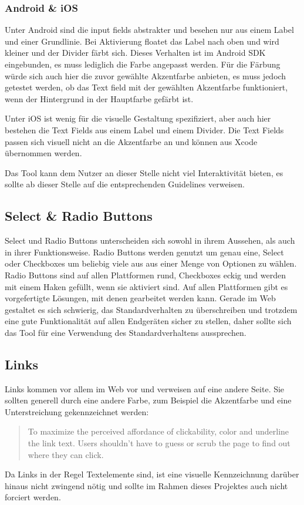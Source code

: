 \subsubsection{Android \& iOS}
Unter Android sind die input fields abstrakter und besehen nur aus einem Label und einer Grundlinie. Bei Aktivierung floatet das Label nach oben und wird kleiner und der Divider färbt sich. Dieses Verhalten ist im Android SDK eingebunden, es muss lediglich die Farbe angepasst werden.
Für die Färbung würde sich auch hier die zuvor gewählte Akzentfarbe anbieten, es muss jedoch getestet werden, ob das Text field mit der gewählten Akzentfarbe funktioniert, wenn der Hintergrund in der Hauptfarbe gefärbt ist.

Unter iOS ist wenig für die visuelle Gestaltung spezifiziert, aber auch hier bestehen die Text Fields aus einem Label und einem Divider. Die Text Fields passen sich visuell nicht an die Akzentfarbe an und können aus Xcode übernommen werden.

Das Tool kann dem Nutzer an dieser Stelle nicht viel Interaktivität bieten, es sollte ab dieser Stelle auf die entsprechenden Guidelines verweisen.

\subsection{Select \& Radio Buttons}
Select und Radio Buttons unterscheiden sich sowohl in ihrem Aussehen, als auch in ihrer Funktionsweise. Radio Buttons werden genutzt um genau eine, Select oder Checkboxes um beliebig viele aus  aus einer Menge von Optionen zu wählen. Radio Buttons sind auf allen Plattformen rund, Checkboxes eckig und werden mit einem Haken gefüllt, wenn sie aktiviert sind. Auf allen Plattformen gibt es vorgefertigte Lösungen, mit denen gearbeitet werden kann. Gerade im Web gestaltet es sich schwierig, das Standardverhalten zu überschreiben und trotzdem eine gute Funktionalität auf allen Endgeräten sicher zu stellen, daher sollte sich das Tool für eine Verwendung des Standardverhaltens aussprechen.

\subsection{Links}
Links kommen vor allem im Web vor und verweisen auf eine andere Seite.
Sie sollten generell durch eine andere Farbe, zum Beispiel die Akzentfarbe und eine Unterstreichung gekennzeichnet werden:

\begin{quote}
To maximize the perceived affordance of clickability, color and underline the link text. Users shouldn't have to guess or scrub the page to find out where they can click. \cite{nielsen2004guide}
\end{quote}

Da Links in der Regel Textelemente sind, ist eine visuelle Kennzeichnung darüber hinaus nicht zwingend nötig und sollte im Rahmen dieses Projektes auch nicht forciert werden.
